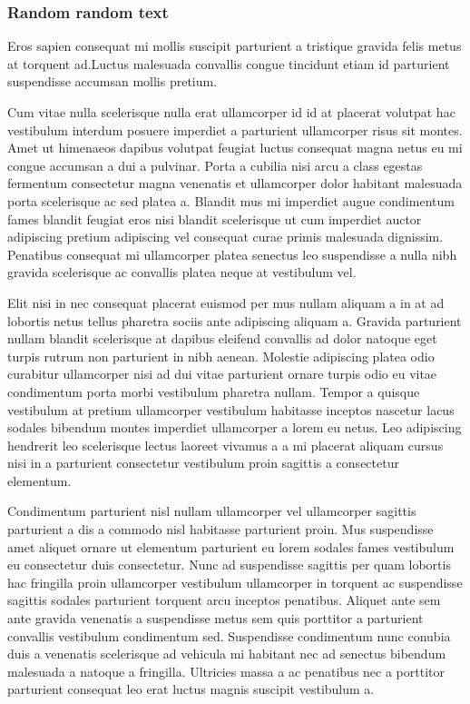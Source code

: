 \subsubsection{Random random text}
Eros sapien consequat mi mollis suscipit parturient a tristique gravida felis metus at torquent ad.Luctus malesuada convallis congue tincidunt etiam id parturient suspendisse accumsan mollis pretium.

Cum vitae nulla scelerisque nulla erat ullamcorper id id at placerat volutpat hac vestibulum interdum posuere imperdiet a parturient ullamcorper risus sit montes. Amet ut himenaeos dapibus volutpat feugiat luctus consequat magna netus eu mi congue accumsan a dui a pulvinar. Porta a cubilia nisi arcu a class egestas fermentum consectetur magna venenatis et ullamcorper dolor habitant malesuada porta scelerisque ac sed platea a. Blandit mus mi imperdiet augue condimentum fames blandit feugiat eros nisi blandit scelerisque ut cum imperdiet auctor adipiscing pretium adipiscing vel consequat curae primis malesuada dignissim. Penatibus consequat mi ullamcorper platea senectus leo suspendisse a nulla nibh gravida scelerisque ac convallis platea neque at vestibulum vel. 

Elit nisi in nec consequat placerat euismod per mus nullam aliquam a in at ad lobortis netus tellus pharetra sociis ante adipiscing aliquam a. Gravida parturient nullam blandit scelerisque at dapibus eleifend convallis ad dolor natoque eget turpis rutrum non parturient in nibh aenean. Molestie adipiscing platea odio curabitur ullamcorper nisi ad dui vitae parturient ornare turpis odio eu vitae condimentum porta morbi vestibulum pharetra nullam. Tempor a quisque vestibulum at pretium ullamcorper vestibulum habitasse inceptos nascetur lacus sodales bibendum montes imperdiet ullamcorper a lorem eu netus. Leo adipiscing hendrerit leo scelerisque lectus laoreet vivamus a a mi placerat aliquam cursus nisi in a parturient consectetur vestibulum proin sagittis a consectetur elementum. 

Condimentum parturient nisl nullam ullamcorper vel ullamcorper sagittis parturient a dis a commodo nisl habitasse parturient proin. Mus suspendisse amet aliquet ornare ut elementum parturient eu lorem sodales fames vestibulum eu consectetur duis consectetur. Nunc ad suspendisse sagittis per quam lobortis hac fringilla proin ullamcorper vestibulum ullamcorper in torquent ac suspendisse sagittis sodales parturient torquent arcu inceptos penatibus. Aliquet ante sem ante gravida venenatis a suspendisse metus sem quis porttitor a parturient convallis vestibulum condimentum sed. Suspendisse condimentum nunc conubia duis a venenatis scelerisque ad vehicula mi habitant nec ad senectus bibendum malesuada a natoque a fringilla. Ultricies massa a ac penatibus nec a porttitor parturient consequat leo erat luctus magnis suscipit vestibulum a. 

